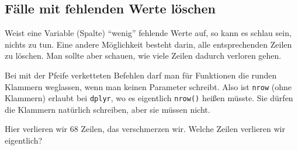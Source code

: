\documentclass[12pt,ngerman,]{book}
\makeatletter
\newenvironment{Shaded}{\begin{snugshade}}{\end{snugshade}}
\newcommand{\KeywordTok}[1]{\textcolor[rgb]{0.13,0.29,0.53}{\textbf{{#1}}}}
\newcommand{\StringTok}[1]{\textcolor[rgb]{0.31,0.60,0.02}{{#1}}}
\newcommand{\CommentTok}[1]{\textcolor[rgb]{0.56,0.35,0.01}{\textit{{#1}}}}
\newcommand{\NormalTok}[1]{{#1}}
\newenvironment{kframe}{%
\medskip{}
\setlength{\fboxsep}{.8em}
 \def\at@end@of@kframe{}%
 \ifinner\ifhmode%
  \def\at@end@of@kframe{\end{minipage}}%
  \begin{minipage}{\columnwidth}%
 \fi\fi%
 \def\FrameCommand##1{\hskip\@totalleftmargin \hskip-\fboxsep
 \colorbox{shadecolor}{##1}\hskip-\fboxsep
     \hskip-\linewidth \hskip-\@totalleftmargin \hskip\columnwidth}%
 \MakeFramed {\advance\hsize-\width
   \@totalleftmargin\z@ \linewidth\hsize
   \@setminipage}}%
 {\par\unskip\endMakeFramed%
 \at@end@of@kframe}
\renewenvironment{Shaded}{\begin{kframe}}{\end{kframe}}
\let\BeginKnitrBlock\begin \let\EndKnitrBlock\end
\makeatother
\begin{document}
\subsection{Fälle mit fehlenden Werte
löschen}\label{falle-mit-fehlenden-werte-loschen}

Weist eine Variable (Spalte) ``wenig'' fehlende Werte auf, so kann es
schlau sein, nichts zu tun. Eine andere Möglichkeit besteht darin, alle
entsprechenden Zeilen zu löschen. Man sollte aber schauen, wie viele
Zeilen dadurch verloren gehen.

\begin{Shaded}
\end{Shaded}

\BeginKnitrBlock{rmdcaution}
Bei mit der Pfeife verketteten Befehlen darf man für Funktionen die
runden Klammern weglassen, wenn man keinen Parameter schreibt. Also ist
\texttt{nrow} (ohne Klammern) erlaubt bei \texttt{dplyr}, wo es
eigentlich \texttt{nrow()} heißen müsste. Sie dürfen die Klammern
natürlich schreiben, aber sie müssen nicht.
\EndKnitrBlock{rmdcaution}

Hier verlieren wir 68 Zeilen, das verschmerzen wir. Welche Zeilen
verlieren wir eigentlich?
\end{document}
